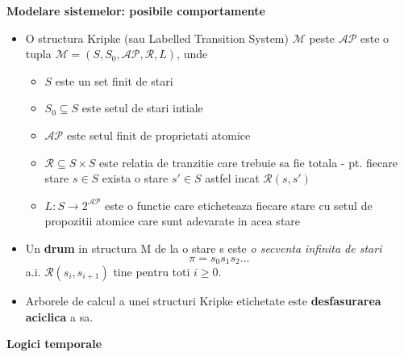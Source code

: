 \documentclass[10pt,a4paper,twocolumn]{report}
\begin{document}
\textbf{Modelare sistemelor: posibile comportamente}
\begin{itemize}
\item O structura Kripke (sau Labelled Transition System) $\mathcal{M}$ peste $\mathcal{AP}$ este o tupla $\mathcal{M} = (S, S_0, \mathcal{AP}, \mathcal{R}, L)$, unde
	\begin{itemize}
	\item $S$ este un set finit de stari
	\item $S_0 \subseteq S$ este setul de stari intiale
	\item $\mathcal{AP}$ este setul finit de proprietati atomice
	\item $\mathcal{R} \subseteq S \times S$ este relatia de tranzitie care trebuie sa fie totala - pt. fiecare stare $s \in S$ exista o stare $s' \in S$ astfel incat $\mathcal{R}(s,s')$
	\item $L: S \rightarrow 2^\mathcal{AP}$ este o functie care eticheteaza fiecare stare cu setul de propozitii atomice care sunt adevarate in acea stare  
	\end{itemize}
\item Un \textbf{drum} in structura M de la o stare s este \textit{o secventa infinita de stari} \[\pi = s_0s_1s_2...\] a.i. $\mathcal{R}(s_i,s_{i+1})$ tine pentru toti $i \geq 0$.
\item Arborele de calcul a unei structuri Kripke etichetate este \textbf{desfasurarea aciclica} a sa.
\end{itemize}

\textbf{Logici temporale}
\end{document}
